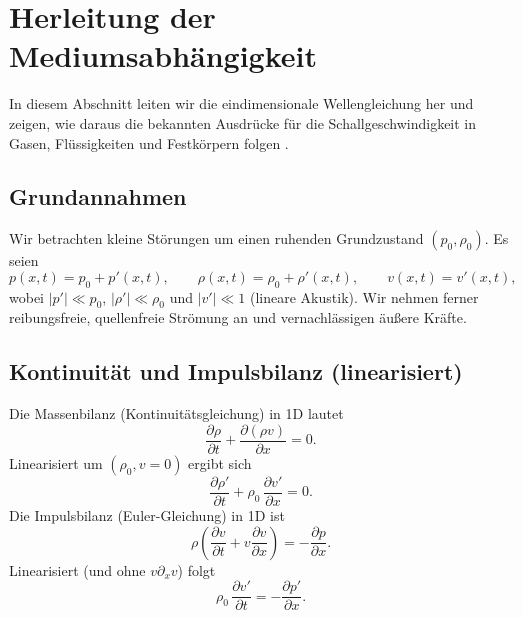 %
%
%
%
\section{Herleitung der Mediumsabhängigkeit
\label{schall:section:teil1}}


In diesem Abschnitt leiten wir die eindimensionale Wellengleichung her und zeigen, wie daraus die bekannten Ausdrücke für die Schallgeschwindigkeit in Gasen, Flüssigkeiten und Festkörpern folgen \cite{schall:kinsler,schall:landaulifschitz}.

\subsection{Grundannahmen}
Wir betrachten kleine Störungen um einen ruhenden Grundzustand $(p_0,\rho_0)$.
Es seien
\[
    p(x,t)=p_0+p'(x,t),\qquad \rho(x,t)=\rho_0+\rho'(x,t),\qquad v(x,t)=v'(x,t),
\]
wobei $|p'|\ll p_0$, $|\rho'|\ll \rho_0$ und $|v'|\ll 1$ (lineare Akustik).
Wir nehmen ferner reibungsfreie, quellenfreie Strömung an und vernachlässigen äußere Kräfte.

\subsection{Kontinuität und Impulsbilanz (linearisiert)}
Die Massenbilanz (Kontinuitätsgleichung) in 1D lautet
\begin{equation}
    \frac{\partial \rho}{\partial t}+\frac{\partial(\rho v)}{\partial x}=0.
\end{equation}
Linearisiert um $(\rho_0, v=0)$ ergibt sich
\begin{equation}
    \frac{\partial \rho'}{\partial t}+\rho_0\,\frac{\partial v'}{\partial x}=0.
    \label{eq:lin-cont}
\end{equation}
Die Impulsbilanz (Euler-Gleichung) in 1D ist
\begin{equation}
    \rho\left(\frac{\partial v}{\partial t}+v\frac{\partial v}{\partial x}\right)=-\frac{\partial p}{\partial x}.
\end{equation}
Linearisiert (und ohne $v\partial_x v$) folgt
\begin{equation}
    \rho_0\,\frac{\partial v'}{\partial t}=-\frac{\partial p'}{\partial x}.
    \label{eq:lin-mom}
\end{equation}

